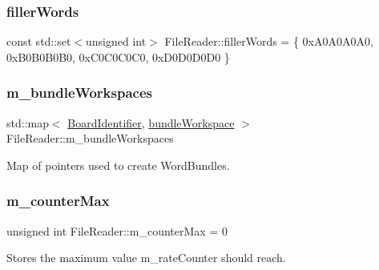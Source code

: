 \subsubsection{\texorpdfstring{filler\+Words}{fillerWords}}
{\footnotesize\ttfamily const std\+::set$<$unsigned int$>$ File\+Reader\+::filler\+Words = \{ 0x\+A0\+A0\+A0\+A0, 0x\+B0\+B0\+B0\+B0, 0x\+C0\+C0\+C0\+C0, 0x\+D0\+D0\+D0\+D0 \}\hspace{0.3cm}{\ttfamily [private]}}

\mbox{\label{class_file_reader_ac9ec812e6d9fbd7014cf0b4fc69557f9}} 
\subsubsection{\texorpdfstring{m\+\_\+bundle\+Workspaces}{m\_bundleWorkspaces}}
{\footnotesize\ttfamily std\+::map$<$ \hyperlink{class_board_identifier}{Board\+Identifier}, \hyperlink{class_file_reader_a7fb625dc45cee3256d37cc19c65cad86}{bundle\+Workspace} $>$ File\+Reader\+::m\+\_\+bundle\+Workspaces\hspace{0.3cm}{\ttfamily [private]}}



Map of pointers used to create Word\+Bundles. 

\mbox{\label{class_file_reader_a7e3ce1501c6bd018d818aab3bfa18cdb}} 
\subsubsection{\texorpdfstring{m\+\_\+counter\+Max}{m\_counterMax}}
{\footnotesize\ttfamily unsigned int File\+Reader\+::m\+\_\+counter\+Max = 0\hspace{0.3cm}{\ttfamily [private]}}



Stores the maximum value m\+\_\+rate\+Counter should reach. 

\mbox{\label{class_file_reader_a983147c8929ee236bfde512c98e7e90d}} 
